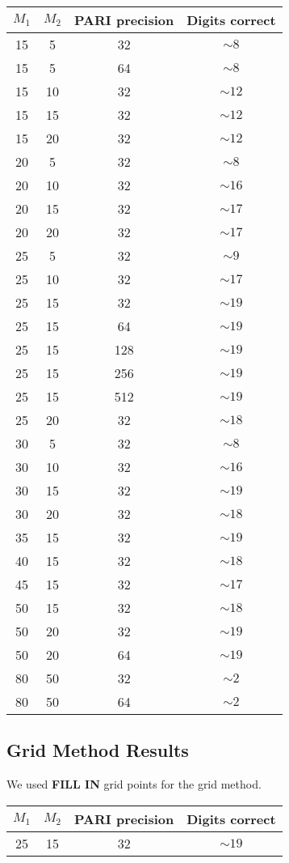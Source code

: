 \documentclass[]{article}
\begin{document}
\begin{center}
\begin{tabular}{|c|c|c||c|}
	\hline
	$M_1$ & $M_2$ & PARI precision & Digits correct \\
	\hline \hline
	15 & 5 & 32 &  $\sim8$ \\
	\hline
	15 & 5 & 64 &  $\sim8$ \\
	\hline
	15 & 10 & 32 &  $\sim12$ \\
	\hline
	15 & 15 & 32 &  $\sim12$ \\
	\hline
	15 & 20 & 32 &  $\sim12$ \\
	\hline
	20 & 5 & 32 &  $\sim8$ \\
	\hline
	20 & 10 & 32 &  $\sim16$ \\
	\hline
	20 & 15 & 32 &  $\sim17$ \\
	\hline
	20 & 20 & 32 &  $\sim17$ \\
	\hline
	25 & 5 & 32 &  $\sim9$ \\
	\hline
	25 & 10 & 32 &  $\sim17$ \\
	\hline
	25 & 15 & 32 &  $\sim19$ \\
	\hline
	25 & 15 & 64 &  $\sim19$ \\
	\hline
	25 & 15 & 128 &  $\sim19$ \\
	\hline
	25 & 15 & 256 &  $\sim19$ \\
	\hline
	25 & 15 & 512 &  $\sim19$ \\
	\hline
	25 & 20 & 32 &  $\sim18$ \\
	\hline
	30 & 5 & 32 &  $\sim8$ \\
	\hline
	30 & 10 & 32 &  $\sim16$ \\
	\hline
	30 & 15 & 32 &  $\sim19$ \\
	\hline
	30 & 20 & 32 &  $\sim18$ \\
	\hline
	35 & 15 & 32 &  $\sim19$ \\
	\hline
	40 & 15 & 32 &  $\sim18$ \\
	\hline
	45 & 15 & 32 &  $\sim17$ \\
	\hline
	50 & 15 & 32 &  $\sim18$ \\
	\hline
	50 & 20 & 32 &  $\sim19$ \\
	\hline
	50 & 20 & 64 &  $\sim19$ \\
	\hline
	80 & 50 & 32 &  $\sim2$ \\
	\hline
	80 & 50 & 64 &  $\sim2$ \\
	\hline
\end{tabular}
\end{center}

\subsection*{Grid Method Results}

We used \textbf{FILL IN} grid points for the grid method.

\begin{center}
	\begin{tabular}{|c|c|c||c|}
		\hline
		$M_1$ & $M_2$ & PARI precision & Digits correct \\
		\hline \hline
		25 & 15 & 32 &  $\sim 19$ \\
		\hline
	\end{tabular}
\end{center}
	
\end{document}
